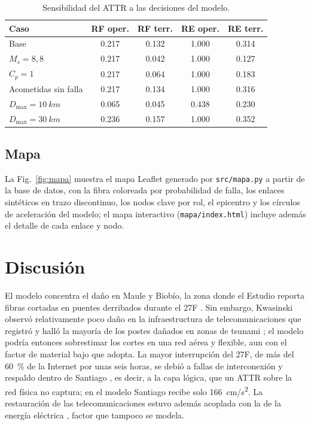 \documentclass[conference]{IEEEtran}
\begin{document}
\begin{table}[t]
\centering
\caption{Sensibilidad del ATTR a las decisiones del modelo.}
\label{tab:sensibilidad}
\footnotesize
\begin{tabular}{@{}lcccc@{}}
\toprule
Caso & RF oper. & RF terr. & RE oper. & RE terr. \\
\midrule
Base & \num{0,217} & \num{0,132} & \num{1,000} & \num{0,314} \\
$M_s=8{,}8$ & \num{0,217} & \num{0,042} & \num{1,000} & \num{0,127} \\
$C_p=1$ & \num{0,217} & \num{0,064} & \num{1,000} & \num{0,183} \\
Acometidas sin falla & \num{0,217} & \num{0,134} & \num{1,000} & \num{0,316} \\
$D_{\max}=\SI{10}{km}$ & \num{0,065} & \num{0,045} & \num{0,438} & \num{0,230} \\
$D_{\max}=\SI{30}{km}$ & \num{0,236} & \num{0,157} & \num{1,000} & \num{0,352} \\
\bottomrule
\end{tabular}
\end{table}

\subsection{Mapa}
La Fig.~\ref{fig:mapa} muestra el mapa Leaflet generado por \texttt{src/mapa.py} a partir de la base de datos, con la fibra coloreada por probabilidad de falla, los enlaces sintéticos en trazo discontinuo, los nodos clave por rol, el epicentro y los círculos de aceleración del modelo; el mapa interactivo (\texttt{mapa/index.html}) incluye además el detalle de cada enlace y nodo.


\section{Discusión}
\label{sec:discusion}
El modelo concentra el daño en Maule y Biobío, la zona donde el Estudio reporta fibras cortadas en puentes derribados durante el 27F \cite{niclabs2018}.
Sin embargo, Kwasinski observó relativamente poco daño en la infraestructura de telecomunicaciones que registró y halló la mayoría de los postes dañados en zonas de tsunami \cite{kwasinski2010}; el modelo podría entonces sobrestimar los cortes en una red aérea y flexible, aun con el factor de material bajo que adopta.
La mayor interrupción del 27F, de más del \SI{60}{\percent} de la Internet por unas seis horas, se debió a fallas de interconexión y respaldo dentro de Santiago \cite{niclabs2018}, es decir, a la capa lógica, que un ATTR sobre la red física no captura; en el modelo Santiago recibe solo \SI{166}{cm/s^2}.
La restauración de las telecomunicaciones estuvo además acoplada con la de la energía eléctrica \cite{duenas2012}, factor que tampoco se modela.
\end{document}
